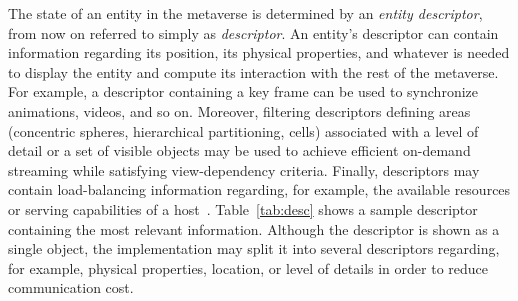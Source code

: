 The state of an entity in the metaverse is determined by an
\emph{entity descriptor}, from now on referred to simply as
\emph{descriptor}. An entity's descriptor can contain information
regarding its position, its physical properties, and whatever is
needed to display the entity and compute its interaction with the rest
of the metaverse. For example, a descriptor containing a key frame can
be used to synchronize animations, videos, and so on. Moreover,
filtering descriptors defining areas (concentric spheres, hierarchical
partitioning, cells) associated with a level of detail or a set of
visible objects may be used to achieve efficient on-demand streaming
while satisfying view-dependency criteria. Finally, descriptors may
contain load-balancing information regarding, for example, the
available resources or serving capabilities of a
host~\cite{cavagna}.
Table~\ref{tab:desc} shows a sample descriptor containing the
most relevant information. Although the descriptor is shown as a
single object, the \sol implementation may split it into several
descriptors regarding, for example, physical properties,
location, or level of details in order to reduce communication cost.







